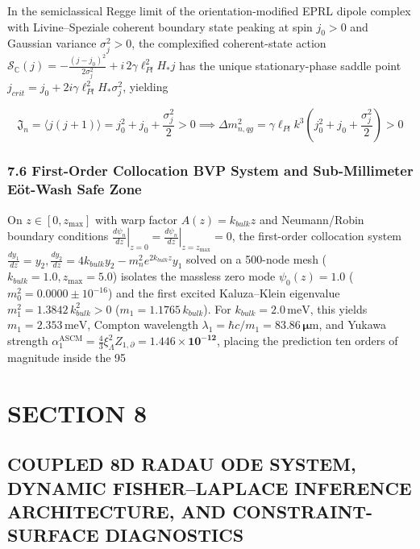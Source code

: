 \documentclass[aps,prd,onecolumn,superscriptaddress,nofootinbib,longbibliography,10pt]{revtex4-2}
\begin{document}
In the semiclassical Regge limit of the orientation-modified EPRL dipole complex with Livine--Speziale coherent boundary state peaking at spin \(j_0 > 0\) and Gaussian variance \(\sigma_j^2 > 0\), the complexified coherent-state action \(\mathcal{S}_{\mathbb{C}}(j) = -\frac{(j - j_0)^2}{2\sigma_j^2} + i\,2\gamma\ell_{Pl}^2 H_* j\) has the unique stationary-phase saddle point \(j_{crit} = j_0 + 2i\gamma\ell_{Pl}^2 H_* \sigma_j^2\), yielding


\[\mathfrak{J}_n = \langle j(j+1)\rangle = j_0^2 + j_0 + \frac{\sigma_j^2}{2} > 0 \implies \Delta m_{n,qg}^2 = \gamma\ell_{Pl} k^3\left( j_0^2 + j_0 + \frac{\sigma_j^2}{2} \right) > 0\]


\subsubsection*{7.6 First-Order Collocation BVP System and Sub-Millimeter E\"ot-Wash Safe Zone}

On \(z \in [0, z_{\max}]\) with warp factor \(A(z) = k_{bulk}z\) and Neumann/Robin boundary conditions \(\left.\frac{d\psi_n}{dz}\right|_{z=0} = \left.\frac{d\psi_n}{dz}\right|_{z=z_{\max}} = 0\), the first-order collocation system \(\frac{dy_1}{dz} = y_2, \frac{dy_2}{dz} = 4k_{bulk}y_2 - m_n^2 e^{2k_{bulk}z}y_1\) solved on a 500-node mesh (\(k_{bulk} = 1.0, z_{\max} = 5.0\)) isolates the massless zero mode \(\psi_0(z) = 1.0\) (\(m_0^2 = 0.0000 \pm 10^{-16}\)) and the first excited Kaluza--Klein eigenvalue \(m_1^2 = 1.3842\,k_{bulk}^2 > 0\) (\(m_1 = 1.1765\,k_{bulk}\)). For \(k_{bulk} = 2.0\,\mathrm{meV}\), this yields \(m_1 = 2.353\,\mathrm{meV}\), Compton wavelength \(\lambda_1 = \hbar c/m_1 = \mathbf{83.86\,\mu\mathrm{m}}\), and Yukawa strength \(\alpha_1^{\mathrm{ASCM}} = \frac{4}{3}\xi_\Lambda^2 Z_{1,\partial} = \mathbf{1.446 \times 10^{-12}}\), placing the prediction ten orders of magnitude inside the 95%




  
\section*{SECTION 8}

  
\subsection*{COUPLED 8D RADAU ODE SYSTEM, DYNAMIC FISHER–LAPLACE INFERENCE ARCHITECTURE, AND CONSTRAINT-SURFACE DIAGNOSTICS}
\end{document}
